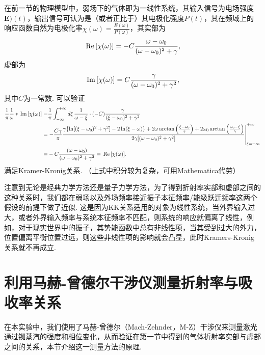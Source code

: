 \documentclass{assignment}
\begin{document}
在前一节的物理模型中，弱场下的气体即为一线性系统，其输入信号为电场强度$\bm{E})(t)$，输出信号可认为是（或者正比于）其电极化强度$P(t)$，其在频域上的响应函数自然为电极化率$\chi(\omega)=\frac{E(\omega)}{P(\omega)}$，其实部为
\begin{align}
    \,\text{Re}\,[\chi(\omega)]=-C\frac{\omega-\omega_0}{(\omega-\omega_0)^2+\gamma},
\end{align}
虚部为
\begin{align}
    \,\text{Im}\,[\chi(\omega)]=C\frac{\gamma}{(\omega-\omega_0)^2+\gamma^2},
\end{align}
其中$C$为一常数.
可以验证
\begin{align}
    \frac{1}{\pi}\frac{1}{\omega}*\,\text{Im}\,[\chi(\omega)]=&\frac{1}{\pi}\int_{-\infty}^{+\infty}d\xi\,\frac{1}{\omega-\xi}\cdot(-C)\frac{\gamma}{(\xi-\omega_0)^2+\gamma^2}\\
    \notag=&\left.-\frac{C\gamma}{\pi}\frac{\gamma\{\ln[(\xi-\omega_0)^2+\gamma^2]-2\ln(\xi-\omega)\}+2\omega\arctan\left(\frac{\xi-\omega_0}{\gamma}\right)+2\omega_0\arctan\left(\frac{\omega_0-\xi}{\gamma}\right)}{2\gamma[(\omega-\omega_0)^2+\gamma^2]}\right\vert_{\xi=-\infty}^{+\infty}\\
    =&-C\frac{(\omega-\omega_0)}{(\omega-\omega_0)^2+\gamma^2}=\,\text{Re}\,[\chi(\omega)].
\end{align}
满足Kramer-Kronig关系.
（上式中积分较为复杂，可用Mathematica代劳）

注意到无论是经典力学方法还是量子力学方法，为了得到折射率实部和虚部之间的这种关系时，我们都在弱场以及外场频率接近振子本征频率/能级跃迁频率这两个假设的前提下做了近似. 这是因为KK关系适用的对象为线性系统，当外界输入过大，或者外界输入频率与系统本征频率不匹配，则系统的响应就偏离了线性，例如，对于现实世界中的振子，其势能函数中总有非线性项，当其受到过大的外力，位置偏离平衡位置过远，则这些非线性项的影响就会凸显，此时Kramers-Kronig关系就不再成立.

\section{利用马赫-曾德尔干涉仪测量折射率与吸收率关系}
在本实验中，我们使用了马赫-曾德尔（Mach-Zehnder，M-Z）干涉仪来测量激光通过铷蒸汽的强度和相位变化，从而验证在第一节中得到的气体折射率实部与虚部之间的关系，本节介绍这一测量方法的原理.
\end{document}
